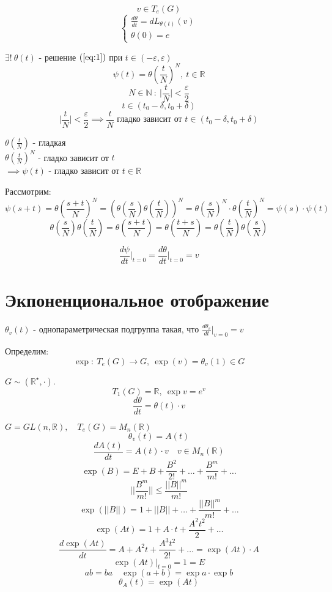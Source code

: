 \documentclass[a4paper]{article}
\theoremstyle{definition}
\theoremstyle{remark}
\begin{document}
\[
    v \in T_e(G)
\]
\begin{equation}
    \label{eq:1}
    \begin{cases}
        \frac{d\theta}{dt} = dL_{\theta(t)}(v)\\
        \theta(0) = e
    \end{cases}
\end{equation}

$ \exists! \  \theta(t) $ - решение $ (\ref{eq:1}) $ при 
$ t \in (-\varepsilon, \varepsilon) $ 
\[
    \psi(t) = \theta\left( \frac{t}{N} \right)^N, \ t \in \mathbb{R}
\]
\[
    N \in \mathbb{N} \ : \ \bigg| \frac{t}{N} \bigg| < \frac{\varepsilon}{2} 
\]
\[
    t \in (t_0 - \delta, t_0 + \delta)
\]
\[
    \bigg| \frac{t}{N} \bigg| < \frac{\varepsilon}{2} \implies
    \frac{t}{N} \text{ гладко зависит от } t \in (t_0 - \delta, t_0 + \delta)
\]

$ \theta\left( \frac{t}{N} \right) $ - гладкая \\
$ \theta\left( \frac{t}{N} \right)^N $ - гладко зависит от $ t $ \\
$ \implies \psi(t) $ - гладко зависит от $ t \in \mathbb{R} $ 

Рассмотрим:
\[
    \psi(s + t) = \theta\left( \frac{s + t}{N} \right)^N = \left(
    \theta\left( \frac{s}{N}\right) \theta\left( \frac{t}{N} \right)\right)^N
    = \theta\left(\frac{s}{N} \right)^N \cdot \theta\left(\frac{t}{N} \right)^N
    = \psi(s) \cdot \psi(t)
\]
\[
    \theta\left(\frac{s}{N}\right)\theta\left(\frac{t}{N}\right)
    = \theta\left( \frac{s+t}{N} \right) = \theta\left(\frac{t+s}{N}\right)
    = \theta\left(\frac{t}{N}\right)\theta\left(\frac{s}{N}\right)
\]

\[
    \frac{d \psi}{dt} \bigg|_{t=0} = \frac{d \theta}{dt} \bigg|_{t=0} = v
\]

\section*{\centering Экпоненциональное отображение}
$ \theta_v(t) $ - однопараметрическая подгруппа такая, что $ \frac{d\theta_v}{dt}
\big|_{v=0} = v$ 

Определим:
\[
    \exp : \ T_e(G) \to G, \ \exp(v) = \theta_v(1) \in G
\]

$ G \sim (\mathbb{R}^{\star}, \cdot) $.
\[
    T_1(G) = \mathbb{R}, \ \exp v = e^{v}
\]
\[
    \frac{d\theta}{dt} = \theta(t) \cdot v
\]

$ G = GL(n, \mathbb{R}), \quad T_e(G) = M_n(\mathbb{R}) $ 
\[
    \theta_v(t) = A(t)
\]
\[
    \frac{dA(t)}{dt} = A(t) \cdot v \quad v \in M_n(\mathbb{R})
\]
\[
    \exp(B) = E + B + \frac{B^2}{2!} + \dots + \frac{B^{m}}{m!} + \dots
\]
\[
    \bigg|\bigg|\frac{B^m}{m!}\bigg|\bigg| \leq \frac{||B||^{m}}{m!} 
\]
\[
    \exp(||B||) = 1 + ||B|| + \dots + \frac{||B||^m}{m!} + \dots
\]
\[
    \exp(At) = 1 + A \cdot t + \frac{A^2t^2}{2} + \dots
\]
\[
    \frac{d\exp(At)}{dt} = A + A^2 t + \frac{A^3 t^2}{2!} + \dots =
    \exp(At) \cdot A
\]
\[
    \exp(At)\big|_{t=0} = 1 = E
\]
\[
    ab=ba \quad \exp(a+b) = \exp a \cdot \exp b 
\]
\[
    \theta_A(t) = \exp(At)
\]
\end{document}
